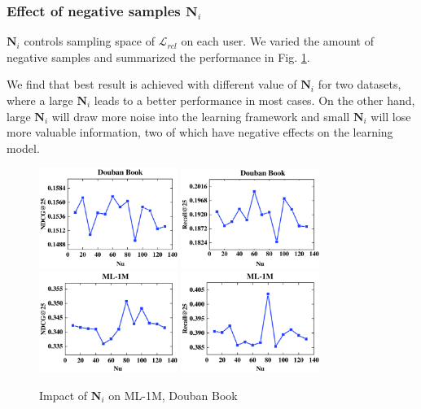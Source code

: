 \subsubsection{Effect of negative samples $\mathbf{N}_i$} \label{subsubsec2}
$\mathbf{N}_i$ controls sampling space of $\mathcal{L}_{rcl}$ on each user. We varied the amount of negative samples and summarized the performance in Fig. \ref{N_u}. 

We find that best result is achieved with different value of $\mathbf{N}_i$ for two datasets, where a large $\mathbf{N}_i$ leads to a better performance in most cases. On the other hand, large $\mathbf{N}_i$ will draw more noise into the learning framework and small $\mathbf{N}_i$ will lose more valuable information, two of which have negative effects on the learning model.




\begin{figure}[!htb]
\centering

{\label{lambda}
    \includegraphics[width=0.4\textwidth]{fig/par/13.pdf}
    \includegraphics[width=0.4\textwidth]{fig/par/14.pdf}
    \includegraphics[width=0.4\textwidth]{fig/par/15.pdf}
    \includegraphics[width=0.4\textwidth]{fig/par/16.pdf}}
\caption{Impact of $\mathbf{N}_i$ on ML-1M, Douban Book } \label{N_u}
\end{figure}



